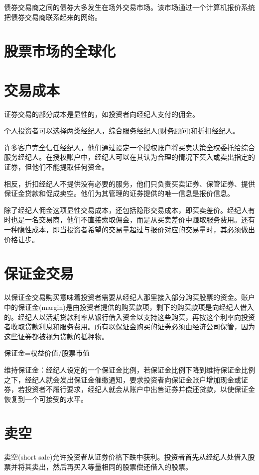 \documentclass{article}
\begin{document}
债券交易商之间的债券大多发生在场外交易市场。该市场通过一个计算机报价系统把债券交易商联系起来的网络。

\section{股票市场的全球化}

\section{交易成本}
证券交易的部分成本是显性的，如投资者向经纪人支付的佣金。

个人投资者可以选择两类经纪人，综合服务经纪人(财务顾问)和折扣经纪人。

许多客户完全信任经纪人，他们通过设定一个授权账户将买卖决策全权委托给综合服务经纪人。在授权账户中，经纪人可以在其认为合理的情况下买入或卖出指定的证券，但他们不能提取任何资金。

相反，折扣经纪人不提供没有必要的服务，他们只负责买卖证券、保管证券、提供保证金贷款和促成卖空。他们为其管理的证券提供的唯一信息是报价信息。

除了经纪人佣金这项显性交易成本，还包括隐形交易成本，即买卖差价。经纪人有时也是一名交易商，他们不直接索取佣金，而是从买卖差价中赚取服务费用。还有一种隐性成本，即当投资者希望的交易量超过与报价对应的交易量时，其必须做出价格让步。

\section{保证金交易}
以保证金交易购买意味着投资者需要从经纪人那里接入部分购买股票的资金。账户中的保证金(margin)是由投资者提供的购买款项，剩下的购买款项是向经纪人借入的。经纪人以活期贷款利率从银行借入资金以支持这些购买，再按这个利率向投资者收取贷款利息和服务费用。所有以保证金购买的证券必须由经济公司保管，因为这些证券都被视为贷款的抵押物。

\hspace*{\fill}

保证金=权益价值/股票市值

\hspace*{\fill}

维持保证金：经纪人设定的一个保证金比例，若保证金比例下降到维持保证金比例之下，经纪人就会发出保证金催缴通知，要求投资者向保证金账户增加现金或证券，若投资者不履行要求，经纪人就会从账户中出售证券并偿还贷款，以使保证金恢复到一个可接受的水平。

\section{卖空}
卖空(short sale)允许投资者从证券价格下跌中获利。投资者首先从经纪人处借入股票并将其卖出，然后再买入等量相同的股票偿还借入的股票。
\end{document}

